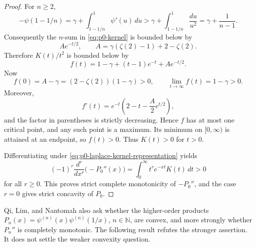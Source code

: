 \documentclass[11pt]{article}
\numberwithin{equation}{section}
\theoremstyle{definition}
\theoremstyle{remark}
\newcommand{\N}{\mathbb N}
\newcommand{\1}{\mathbf 1}
\begin{document}
\begin{proof}
For \(n\ge2\),
\begin{equation}
\label{eq:p0-minus-psi-lower}
-\psi(1-1/n)
=\gamma+\int_{1-1/n}^{1}\psi'(u)\,du
>\gamma+\int_{1-1/n}^{1}\frac{du}{u^2}
=\gamma+\frac1{n-1}.
\end{equation}
Consequently the \(n\)-sum in \eqref{eq:p0-kernel} is bounded below by
\begin{equation}
\label{eq:p0-n-sum-lower}
Ae^{-t/2},
\qquad
A=\gamma(\zeta(2)-1)+2-\zeta(2).
\end{equation}
Therefore \(K(t)/t^2\) is bounded below by
\begin{equation}
\label{eq:p0-f-lower}
f(t)=1-\gamma+(t-1)e^{-t}+Ae^{-t/2}.
\end{equation}
Now
\begin{equation}
\label{eq:p0-f-endpoints}
f(0)=A-\gamma=(2-\zeta(2))(1-\gamma)>0,
\qquad
\lim_{t\to\infty}f(t)=1-\gamma>0.
\end{equation}
Moreover,
\begin{equation}
\label{eq:p0-f-derivative}
f'(t)=e^{-t}\left(2-t-\frac{A}{2}e^{t/2}\right),
\end{equation}
and the factor in parentheses is strictly decreasing.  Hence \(f\) has at most one critical point, and any such point is a maximum.  Its minimum on \([0,\infty)\) is attained at an endpoint, so \(f(t)>0\).  Thus \(K(t)>0\) for \(t>0\).

Differentiating under \eqref{eq:p0-laplace-kernel-representation} yields
\begin{equation}
\label{eq:p0-complete-monotonicity}
(-1)^r\frac{d^r}{dx^r}\bigl(-P_0''(x)\bigr)
=\int_0^\infty t^r e^{-xt}K(t)\,dt>0
\end{equation}
for all \(r\ge0\).  This proves strict complete monotonicity of \(-P_0''\), and the case \(r=0\) gives strict concavity of \(P_0\).
\end{proof}

Qi, Lim, and Nantomah also ask whether the higher-order products \(P_n(x)=\psi^{(n)}(x)\psi^{(n)}(1/x)\), \(n\in\N\), are convex, and more strongly whether \(P_n''\) is completely monotonic.  The following result refutes the stronger assertion.  It does not settle the weaker convexity question.
\end{document}
